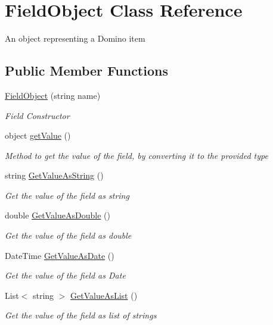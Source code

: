 \hypertarget{class_field_object}{}\section{Field\+Object Class Reference}
\label{class_field_object}


An object representing a Domino item  


\subsection*{Public Member Functions}
\begin{DoxyCompactItemize}
\item 
\mbox{\hyperlink{class_field_object_a87d8d3f1a36d94dec64e8e467950074b}{Field\+Object}} (string name)
\begin{DoxyCompactList}\small\item\em Field Constructor \end{DoxyCompactList}\item 
object \mbox{\hyperlink{class_field_object_a8d962cda039f78f485232bd2764176c4}{get\+Value}} ()
\begin{DoxyCompactList}\small\item\em Method to get the value of the field, by converting it to the provided type \end{DoxyCompactList}\item 
string \mbox{\hyperlink{class_field_object_ad223b04d429de4b2c57838ffb41d124b}{Get\+Value\+As\+String}} ()
\begin{DoxyCompactList}\small\item\em Get the value of the field as string \end{DoxyCompactList}\item 
double \mbox{\hyperlink{class_field_object_aafe2b7d3e7d414345d85e19dddce3c47}{Get\+Value\+As\+Double}} ()
\begin{DoxyCompactList}\small\item\em Get the value of the field as double \end{DoxyCompactList}\item 
Date\+Time \mbox{\hyperlink{class_field_object_a797ebc6615a86bafd9bd17f09562f2ee}{Get\+Value\+As\+Date}} ()
\begin{DoxyCompactList}\small\item\em Get the value of the field as Date \end{DoxyCompactList}\item 
List$<$ string $>$ \mbox{\hyperlink{class_field_object_a635d7598cbf7bbc29821cb1c012de964}{Get\+Value\+As\+List}} ()
\begin{DoxyCompactList}\small\item\em Get the value of the field as list of strings \end{DoxyCompactList}\end{DoxyCompactItemize}
